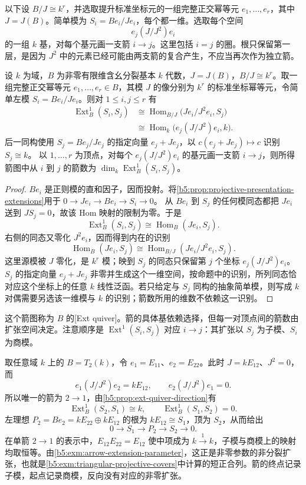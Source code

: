 以下设 \(B/J\cong k^r\)，并选取提升标准坐标元的一组完整正交幂等元 \(e_1,\ldots,e_r\)，其中 \(J=J(B)\)。简单模为 \(S_i=Be_i/Je_i\)，每个都一维。选取每个空间
\[
	e_j(J/J^2)e_i
\]
的一组 \(k\) 基，对每个基元画一支箭 \(i\to j\)。这里包括 \(i=j\) 的圈。根只保留第一层，是因为 \(J^2\) 中的元素已经可能由两支箭的复合产生，不应当再次作为独立箭。
\begin{proposition}\label{b5:prop:ext-quiver-direction}
	设 \(k\) 为域，\(B\) 为非零有限维含幺分裂基本 \(k\) 代数，\(J=J(B)\)，\(B/J\cong k^r\)。取一组完整正交幂等元 \(e_1,\ldots,e_r\in B\)，其模 \(J\) 的像分别为 \(k^r\) 的标准坐标幂等元，令简单左模 \(S_i=Be_i/Je_i\)。则对 \(1\le i,j\le r\) 有
	\[
		\begin{aligned}
			\operatorname{Ext}_B^1(S_i,S_j) &\cong \operatorname{Hom}_{B/J}\bigl(Je_i/J^2e_i,S_j\bigr)\\
			&\cong \operatorname{Hom}_k\bigl(e_j(J/J^2)e_i,k\bigr).
		\end{aligned}
	\]
	后一同构使用 \(S_j=Be_j/Je_j\) 的指定向量 \(e_j+Je_j\)，以 \(c(e_j+Je_j)\mapsto c\) 识别 \(S_j\cong k\)。 以 \(1,\ldots,r\) 为顶点，对每个 \(e_j(J/J^2)e_i\) 的基元画一支箭 \(i\to j\)，则所得箭图中从 \(i\) 到 \(j\) 的箭数为 \(\dim_k\operatorname{Ext}_B^1(S_i,S_j)\)。
\end{proposition}
\begin{proof}
	\(Be_i\) 是正则模的直和因子，因而投射。将\cref{b5:prop:projective-presentation-extensions}用于 \(0\to Je_i\to Be_i\to S_i\to0\)。 从 \(Be_i\) 到 \(S_j\) 的任何模同态都把 \(Je_i\) 送到 \(JS_j=0\)，故该 Hom 映射的限制为零。于是
	\[
		\operatorname{Ext}_B^1(S_i,S_j)\cong\operatorname{Hom}_B(Je_i,S_j).
	\]
	右侧的同态又零化 \(J^2e_i\)，因而得到内在的识别
	\[
		\operatorname{Hom}_B(Je_i,S_j) \cong\operatorname{Hom}_{B/J}(Je_i/J^2e_i,S_j).
	\]
	这里源模被 \(J\) 零化，是 \(k^r\) 模；映到 \(S_j\) 的同态只保留第 \(j\) 个坐标 \(e_j(J/J^2)e_i\)。\(S_j\) 的指定向量 \(e_j+Je_j\) 非零并生成这个一维空间，按命题中的识别，所列同态恰对应这个坐标上的任意 \(k\) 线性泛函。若只给定与 \(S_j\) 同构的抽象简单模，则写成 \(k\) 对偶需要另选该一维模与 \(k\) 的识别；箭数所用的维数不依赖这一识别。
\end{proof}
这个箭图称为 \(B\) 的[Ext quiver]。箭的具体基依赖选择，但每一对顶点间的箭数由扩张空间决定。注意顺序是 \(\operatorname{Ext}^1(S_i,S_j)\) 对应 \(i\to j\)：其扩张以 \(S_j\) 为子模、\(S_i\) 为商模。

\ProseParagraphBreak

取任意域 \(k\) 上的 \(B=T_2(k)\)，令 \(e_1=E_{11}\)、\(e_2=E_{22}\)。此时 \(J=kE_{12}\)、\(J^2=0\)，而
\[
	e_1(J/J^2)e_2=kE_{12},\qquad e_2(J/J^2)e_1=0.
\]
所以唯一的箭为 \(2\to1\)，由\cref{b5:prop:ext-quiver-direction}有
\[
	\operatorname{Ext}_B^1(S_2,S_1)\cong k, \qquad \operatorname{Ext}_B^1(S_1,S_2)=0.
\]
左理想 \(P_2=Be_2=kE_{22}\oplus kE_{12}\) 的根为 \(kE_{12}\cong S_1\)，顶为 \(S_2\)，从而给出
\[
	0\longrightarrow S_1\longrightarrow P_2 \longrightarrow S_2\longrightarrow0.
\]
在单箭 \(2\to1\) 的表示中，\(E_{12}E_{22}=E_{12}\) 使中项成为 \(k\xrightarrow{1}k\)，子模与商模上的映射均取恒等。由\cref{b5:exm:arrow-extension-parameter}，这正是非零参数的非分裂扩张，也就是\cref{b5:exm:triangular-projective-covers}中计算的短正合列。箭的终点记录子模，起点记录商模，反向没有对应的非零扩张。


